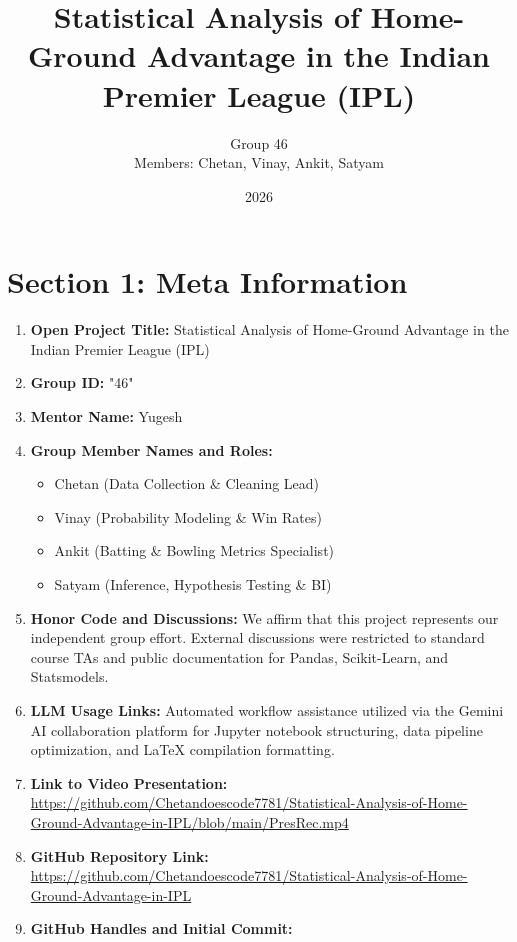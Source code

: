 \documentclass[11pt,a4paper]{article}
\title{Statistical Analysis of Home-Ground Advantage in the Indian Premier League (IPL)}
\author{Group 46 \\ Members: Chetan, Vinay, Ankit, Satyam}
\date{2026}
\begin{document}
\maketitle


\section*{Section 1: Meta Information}

\begin{enumerate}
    \item \textbf{Open Project Title:} Statistical Analysis of Home-Ground Advantage in the Indian Premier League (IPL)
    \item \textbf{Group ID:} "46"
    \item \textbf{Mentor Name:} Yugesh
    \item \textbf{Group Member Names and Roles:} 
    \begin{itemize}
        \item Chetan (Data Collection \& Cleaning Lead)
        \item Vinay (Probability Modeling \& Win Rates)
        \item Ankit (Batting \& Bowling Metrics Specialist)
        \item Satyam (Inference, Hypothesis Testing \& BI)
    \end{itemize}
    \item \textbf{Honor Code and Discussions:} We affirm that this project represents our independent group effort. External discussions were restricted to standard course TAs and public documentation for Pandas, Scikit-Learn, and Statsmodels.
    \item \textbf{LLM Usage Links:} Automated workflow assistance utilized via the Gemini AI collaboration platform for Jupyter notebook structuring, data pipeline optimization, and LaTeX compilation formatting.
    \item \textbf{Link to Video Presentation:} \url{https://github.com/Chetandoescode7781/Statistical-Analysis-of-Home-Ground-Advantage-in-IPL/blob/main/PresRec.mp4}
    \item \textbf{GitHub Repository Link:} \url{https://github.com/Chetandoescode7781/Statistical-Analysis-of-Home-Ground-Advantage-in-IPL}
    \item \textbf{GitHub Handles and Initial Commit:} 

\end{enumerate}
\end{document}
